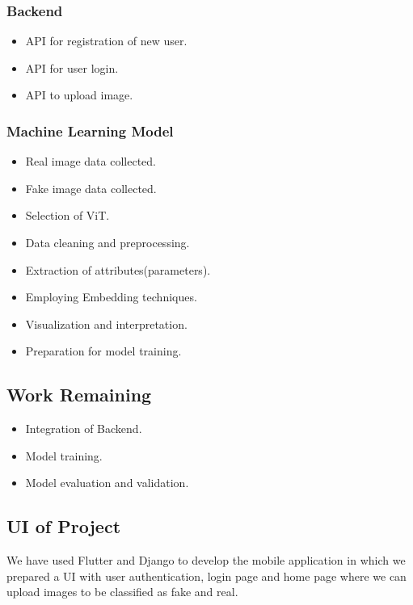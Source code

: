 \subsubsection{Backend}
\begin{itemize}
    \item API for registration of new user.
    \item API for user login.
    \item API to upload image.
\end{itemize}
\subsubsection{Machine Learning Model}
\begin{itemize}
    \item Real image data collected.
    \item Fake image data collected.
    \item Selection of ViT.
    \item Data cleaning and preprocessing.
    \item Extraction of attributes(parameters).
    \item Employing Embedding techniques.
    \item Visualization and interpretation.
    \item Preparation for model training.
\end{itemize}

\subsection{Work Remaining}
\begin{itemize}
    \item Integration of Backend.
    \item Model training.
    \item Model evaluation and validation.
\end{itemize}

\subsection{UI of Project}
We have used Flutter and Django to develop the mobile application in which we prepared a
UI with user authentication, login page and home page where we can upload images to be classified as fake and real.\\

